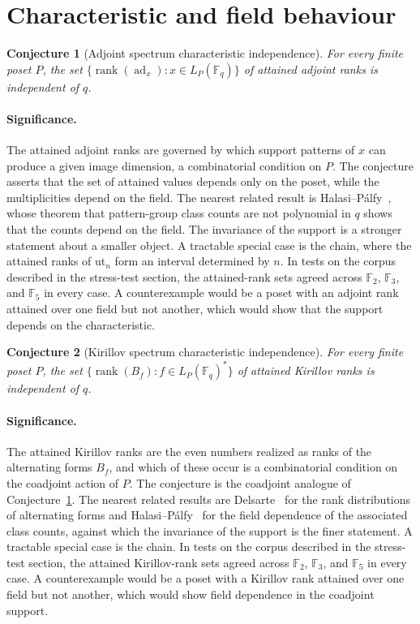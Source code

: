 \documentclass[11pt]{article}
\newtheorem{conjecture}{Conjecture}
\theoremstyle{definition}
\newcommand{\rank}{\operatorname{rank}}
\newcommand{\Fq}{\mathbb F}
\begin{document}
\section{Characteristic and field behaviour}

\begin{conjecture}[Adjoint spectrum characteristic independence]\label{v7}
For every finite poset $P$, the set $\{\rank(\operatorname{ad}_x):x\in L_P(\Fq_q)\}$ of attained adjoint ranks is independent of $q$.
\end{conjecture}

\paragraph{Significance.}
The attained adjoint ranks are governed by which support patterns of $x$ can produce a given image dimension, a combinatorial condition on $P$.  The conjecture asserts that the set of attained values depends only on the poset, while the multiplicities depend on the field.  The nearest related result is Halasi--P\'alfy~\cite{HP}, whose theorem that pattern-group class counts are not polynomial in $q$ shows that the counts depend on the field.  The invariance of the support is a stronger statement about a smaller object.  A tractable special case is the chain, where the attained ranks of $\mathrm{ut}_n$ form an interval determined by $n$.  In tests on the corpus described in the stress-test section, the attained-rank sets agreed across $\Fq_2$, $\Fq_3$, and $\Fq_5$ in every case.  A counterexample would be a poset with an adjoint rank attained over one field but not another, which would show that the support depends on the characteristic.

\begin{conjecture}[Kirillov spectrum characteristic independence]\label{v8}
For every finite poset $P$, the set $\{\rank(B_f):f\in L_P(\Fq_q)^*\}$ of attained Kirillov ranks is independent of $q$.
\end{conjecture}

\paragraph{Significance.}
The attained Kirillov ranks are the even numbers realized as ranks of the alternating forms $B_f$, and which of these occur is a combinatorial condition on the coadjoint action of $P$.  The conjecture is the coadjoint analogue of Conjecture~\ref{v7}.  The nearest related results are Delsarte~\cite{Del} for the rank distributions of alternating forms and Halasi--P\'alfy~\cite{HP} for the field dependence of the associated class counts, against which the invariance of the support is the finer statement.  A tractable special case is the chain.  In tests on the corpus described in the stress-test section, the attained Kirillov-rank sets agreed across $\Fq_2$, $\Fq_3$, and $\Fq_5$ in every case.  A counterexample would be a poset with a Kirillov rank attained over one field but not another, which would show field dependence in the coadjoint support.
\end{document}

